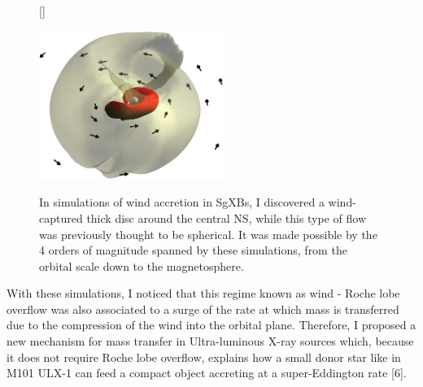 \documentclass[letterpaper,12pt,onecolumn]{article}
\makeatletter
\newcommand{\sgxs}{SgXBs\xspace}
\newcommand*{\ns}{NS\@\xspace}
\makeatother
\begin{document}



\vspace*{-0.3cm}
\begin{figure}[!h]
[\FBwidth]
{\caption{In simulations of wind accretion in \sgxs, I discovered a wind-captured thick disc around the central \ns, while this type of flow was previously thought to be spherical. It was made possible by the 4 orders of magnitude spanned by these simulations, from the orbital scale down to the magnetosphere.}\label{fig:disc}}
{\includegraphics[width=6cm]{Figures/disc.png}}
\vspace*{-0.4cm}
\end{figure}

With these simulations, I noticed that this regime known as wind - Roche lobe overflow was also associated to a surge of the rate at which mass is transferred due to the compression of the wind into the orbital plane. Therefore, I proposed a new mechanism for mass transfer in Ultra-luminous X-ray sources which, because it does not require Roche lobe overflow, explains how a small donor star like in M101 ULX-1 can feed a compact object accreting at a super-Eddington rate [6]. 
\end{document}
